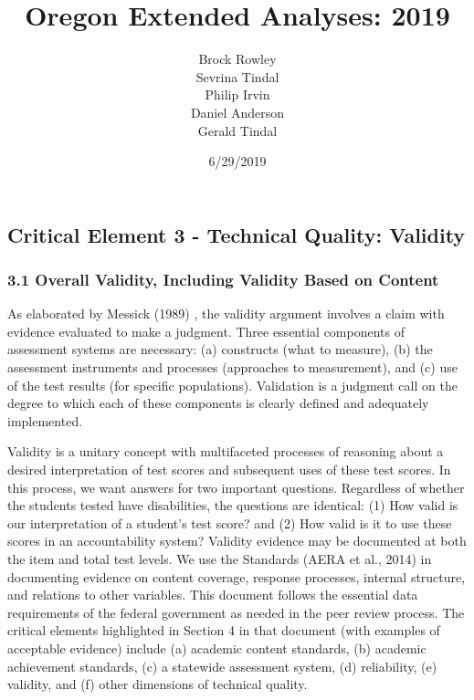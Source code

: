 \documentclass[]{article}
\title{Oregon Extended Analyses: 2019}
\author{Brock Rowley \\ Sevrina Tindal \\ Philip Irvin \\ Daniel Anderson \\ Gerald Tindal}
\date{6/29/2019}
\begin{document}
\maketitle

{
\setcounter{tocdepth}{5}
\tableofcontents
}
\hypertarget{critical-element-3---technical-quality-validity}{%
\subsection{Critical Element 3 - Technical Quality:
Validity}\label{critical-element-3---technical-quality-validity}}

\hypertarget{overall-validity-including-validity-based-on-content}{%
\subsubsection{3.1 Overall Validity, Including Validity Based on
Content}\label{overall-validity-including-validity-based-on-content}}

As elaborated by Messick (1989) , the validity argument involves a claim
with evidence evaluated to make a judgment. Three essential components
of assessment systems are necessary: (a) constructs (what to measure),
(b) the assessment instruments and processes (approaches to
measurement), and (c) use of the test results (for specific
populations). Validation is a judgment call on the degree to which each
of these components is clearly defined and adequately implemented.

Validity is a unitary concept with multifaceted processes of reasoning
about a desired interpretation of test scores and subsequent uses of
these test scores. In this process, we want answers for two important
questions. Regardless of whether the students tested have disabilities,
the questions are identical: (1) How valid is our interpretation of a
student's test score? and (2) How valid is it to use these scores in an
accountability system? Validity evidence may be documented at both the
item and total test levels. We use the Standards (AERA et al., 2014) in
documenting evidence on content coverage, response processes, internal
structure, and relations to other variables. This document follows the
essential data requirements of the federal government as needed in the
peer review process. The critical elements highlighted in Section 4 in
that document (with examples of acceptable evidence) include (a)
academic content standards, (b) academic achievement standards, (c) a
statewide assessment system, (d) reliability, (e) validity, and (f)
other dimensions of technical quality.
\end{document}
